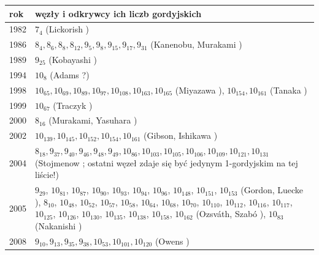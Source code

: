 {
    \setlength{\intextsep}{4pt plus 2pt minus 2pt}
\begin{table}[H]
    \raggedright
    \footnotesize
    \centering
    \begin{tabular}{l|p{100mm}} \toprule
    rok & węzły i odkrywcy ich liczb gordyjskich \\ \midrule
    1982 & $7_{4}$ (Lickorish \cite{lickorish1985}) \\
    1986 & $8_{4}, 8_{6}, 8_{8}, 8_{12}, 9_{5}, 9_{8}, 9_{15}, 9_{17}, 9_{31}$ (Kanenobu, Murakami \cite{kanenobumurakami1986}) \\
    1989 & $9_{25}$ (Kobayashi \cite{kobayashi1989}) \\
    1994 & $10_{8}$ (Adams \cite[s. 62]{adams1994}?) \\
    1998 & $10_{65}, 10_{69}, 10_{89}, 10_{97}, 10_{108}, 10_{163}, 10_{165}$ (Miyazawa \cite{miyazawa1998}), $10_{154}, 10_{161}$ (Tanaka \cite{tanaka1998}) \\
    1999 & $10_{67}$ (Traczyk \cite{traczyk1999}) \\
    2000 & $8_{16}$ (Murakami, Yasuhara \cite{yasuhara2000}) \\
    2002 & $10_{139}, 10_{145}, 10_{152}, 10_{154}, 10_{161}$ (Gibson, Ishikawa \cite{ishikawa2002}) \\
    2004 & $8_{18}, 9_{37}, 9_{40}, 9_{46}, 9_{48}, 9_{49}, 10_{86}, 10_{103}, 10_{105}, 10_{106}, 10_{109}, 10_{121}, 10_{131}$ (Stojmenow \cite{stoimenow2004}; ostatni węzeł zdaje się być jedynym 1-gordyjskim na tej liście!) \\
    2005 & $9_{29}$, $10_{81}$, $10_{87}$, $10_{90}$, $10_{93}$, $10_{94}$, $10_{96}$, $10_{148}$, $10_{151}$, $10_{153}$ (Gordon, Luecke \cite{gordon2006}), $8_{10}$, $10_{48}$, $10_{52}$, $10_{57}$, $10_{58}$, $10_{64}$, $10_{68}$, $10_{70}$, $10_{110}$, $10_{112}$, $10_{116}$, $10_{117}$, $10_{125}$, $10_{126}$, $10_{130}$, $10_{135}$, $10_{138}$, $10_{158}$, $10_{162}$ (Ozsváth, Szabó \cite{szabo2005}), $10_{83}$ (Nakanishi \cite{nakanishi2005}) \\
    2008 & $9_{10}, 9_{13}, 9_{35}, 9_{38}, 10_{53}, 10_{101}, 10_{120}$ (Owens \cite{owens2008}) \\
    \bottomrule
    \hline
    \end{tabular}
\end{table}
}
%
%
%
%
%
%
%
%
%
%
%
%
%
%
%
%
%
%
\normalsize

